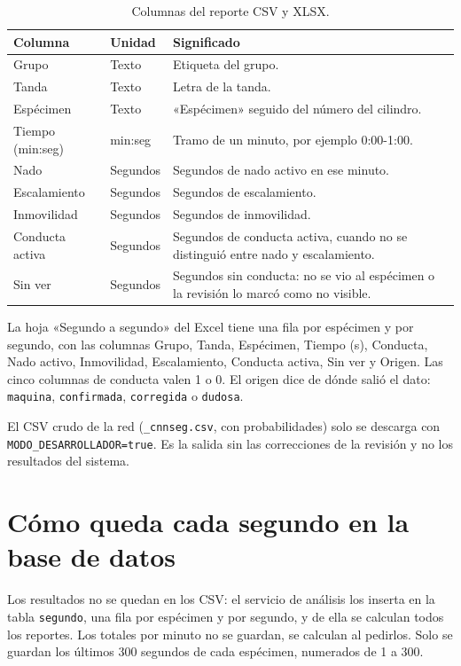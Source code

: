\begin{table}[H]
\centering
\caption{Columnas del reporte CSV y XLSX.}
\label{tab:ap_reporte_csv}
\begin{tabular}{|p{3.6cm}|p{2.2cm}|p{8.0cm}|}
\hline
\textbf{Columna} & \textbf{Unidad} & \textbf{Significado} \\
\hline
Grupo & Texto & Etiqueta del grupo. \\
\hline
Tanda & Texto & Letra de la tanda. \\
\hline
Espécimen & Texto & «Espécimen» seguido del número del cilindro. \\
\hline
Tiempo (min:seg) & min:seg & Tramo de un minuto, por ejemplo 0:00-1:00. \\
\hline
Nado & Segundos & Segundos de nado activo en ese minuto. \\
\hline
Escalamiento & Segundos & Segundos de escalamiento. \\
\hline
Inmovilidad & Segundos & Segundos de inmovilidad. \\
\hline
Conducta activa & Segundos & Segundos de conducta activa, cuando no se distinguió
entre nado y escalamiento. \\
\hline
Sin ver & Segundos & Segundos sin conducta: no se vio al espécimen o la revisión lo
marcó como no visible. \\
\hline
\end{tabular}
\end{table}

La hoja «Segundo a segundo» del Excel tiene una fila por espécimen y por segundo, con
las columnas Grupo, Tanda, Espécimen, Tiempo (s), Conducta, Nado activo, Inmovilidad,
Escalamiento, Conducta activa, Sin ver y Origen. Las cinco columnas de conducta valen 1
o 0. El origen dice de dónde salió el dato: \texttt{maquina}, \texttt{confirmada},
\texttt{corregida} o \texttt{dudosa}.

El CSV crudo de la red (\texttt{\_cnnseg.csv}, con probabilidades) solo se descarga con
\texttt{MODO\_DESARROLLADOR=true}. Es la salida sin las correcciones de la revisión y no
los resultados del sistema.

\section{Cómo queda cada segundo en la base de datos}

Los resultados no se quedan en los CSV: el servicio de análisis los inserta en la tabla
\texttt{segundo}, una fila por espécimen y por segundo, y de ella se calculan todos los
reportes. Los totales por minuto no se guardan, se calculan al pedirlos. Solo se
guardan los últimos 300 segundos de cada espécimen, numerados de 1 a 300.

